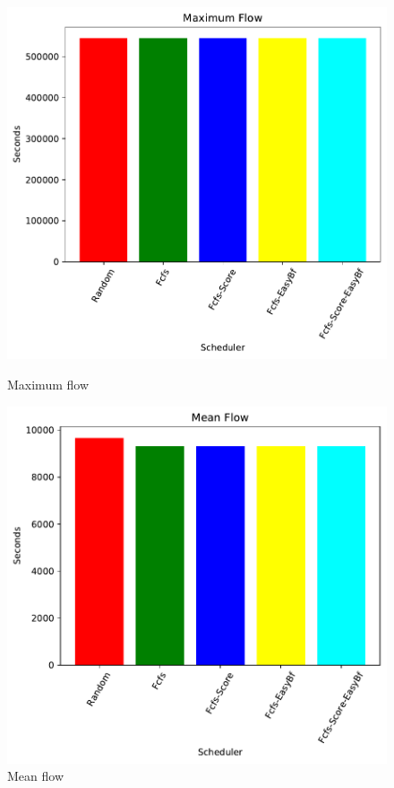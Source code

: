\documentclass[a4paper]{article}
\begin{document}
	\begin{figure}[H]
	\begin{minipage}[b]{0.5\linewidth}\centering\includegraphics[width=1.11\linewidth]{MBSS/plot/2021-05-23_Maximum_flow.pdf}\caption{Maximum flow}\vspace{4ex}\end{minipage}
	\begin{minipage}[b]{0.5\linewidth}\centering\includegraphics[width=1.11\linewidth]{MBSS/plot/2021-05-23_Mean_flow.pdf}\caption{Mean flow}\vspace{4ex}\end{minipage} 

\end{figure}
\end{document}
